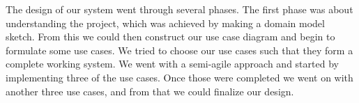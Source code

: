 

The design of our system went through several phases. The first phase was about understanding the project, which was achieved by making a domain model sketch. From this we could then construct our use case diagram and begin to formulate some use cases. We tried to choose our use cases such that they form a complete working system. We went with a semi-agile approach and started by implementing three of the use cases. Once those were completed we went on with another three use cases, and from that we could finalize our design. 